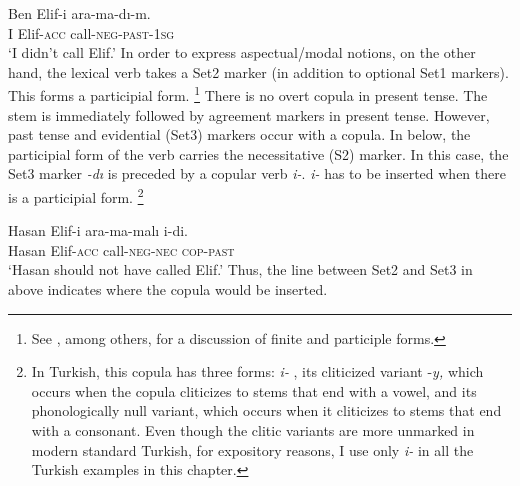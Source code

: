 \documentclass[output=paper]{langsci/langscibook}
\begin{document}
\ea%
    \label{kelepirex:key:4}
    \gll Ben Elif-i ara-ma-dı-m.\\
    I Elif-\textsc{acc} call-\textsc{neg}-\textsc{past}-\textsc{1sg} \\
    \glt `I didn't call Elif.'
\z 
In order to express aspectual/modal notions, on the other hand, the lexical verb takes a Set2 marker (in addition to optional Set1 markers). 
This forms a participial form.%
\footnote{%
    See \citealt{Lees1962,Kornfilt1996,Goksel1997,Kelepir2001,Sezer2001}, among others, 
    for a discussion of finite and participle forms.
} 
There is no overt copula in present tense. 
The stem is immediately followed by agreement markers in present tense. 
However, past tense and evidential (Set3) markers  occur with a copula. 
In  below, the participial form of the verb carries the necessitative (S2) marker. 
In this case, the Set3 marker \textit{-dı} is preceded by a copular verb \textit{i-}. 
\textit{i-} has to be inserted when there is a participial form.%
\footnote{%
    \label{kelepirftn:key:7}
    In Turkish, this copula has three forms: 
    \textit{i-} , 
    its cliticized variant -\textit{y,} which occurs when the copula cliticizes to stems that end with a vowel, 
    and its phonologically null variant, which occurs when it cliticizes to stems that end with a consonant. 
    Even though the clitic variants are more unmarked in modern standard Turkish, for expository reasons, 
    I use only \textit{i-} in all the Turkish examples in this chapter.
}

\ea%
    \label{kelepirex:key:5}
    \gll Hasan Elif-i ara-ma-malı i-di.\\
    Hasan Elif-\textsc{acc} call-\textsc{neg}{}-\textsc{nec} \textsc{cop}{}-\textsc{past} \\
    \glt `Hasan should not have called Elif.'
    \z
Thus, the line between Set2 and Set3 in  above indicates where the copula would be inserted. 
\end{document}
